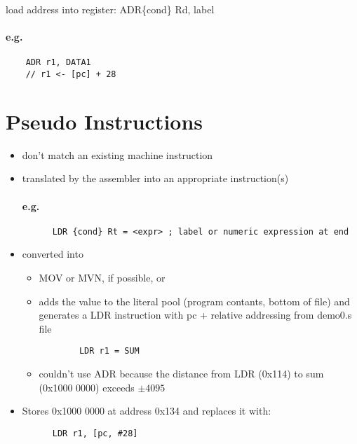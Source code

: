   load address into register: ADR\{cond\} Rd, label
  \paragraph{e.g.}
  \begin{lstlisting}
    ADR r1, DATA1
    // r1 <- [pc] + 28
  \end{lstlisting}

\section{Pseudo Instructions}
  \begin{itemize}
    \item don't match an existing machine instruction
    \item translated by the assembler into an appropriate instruction(s)
    \paragraph{e.g.}
    \begin{lstlisting}
      LDR {cond} Rt = <expr> ; label or numeric expression at end
    \end{lstlisting}
    \item converted into
    \begin{itemize}
      \item MOV or MVN, if possible, or
      \item adds the value to the literal pool (program contants, bottom of
      file) and generates a LDR instruction with pc + relative addressing from
      demo0.s file
      \begin{lstlisting}
        LDR r1 = SUM
      \end{lstlisting}
      \item couldn't use ADR because the distance from LDR (0x114) to sum (0x1000
      0000) exceeds $\pm 4095$
    \end{itemize}
    \item Stores 0x1000 0000 at address 0x134 and replaces it with:
    \begin{lstlisting}
      LDR r1, [pc, #28]
    \end{lstlisting}
  \end{itemize}

